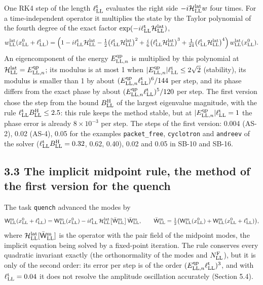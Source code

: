 \documentclass[
  10pt,
]{article}
\begin{document}
One RK4 step of the length \(\ell^{\rm t}_{\rm LL}\) evaluates the right
side \(-i\mathcal H^{\rm lat}_{\rm LL}w\) four times. For a
time-independent operator it multiplies the state by the Taylor
polynomial of the fourth degree of the exact factor
\(\exp(-i\ell^{\rm t}_{\rm LL}\mathcal H^{\rm lat}_{\rm LL})\),
\[w^{\rm lat}_{\rm LL}(x^0_{\rm LL}+\ell^{\rm t}_{\rm LL})=\Big(1-i\ell^{\rm t}_{\rm LL}\mathcal H^{\rm lat}_{\rm LL}-\tfrac12\big(\ell^{\rm t}_{\rm LL}\mathcal H^{\rm lat}_{\rm LL}\big)^2+\tfrac{i}{6}\big(\ell^{\rm t}_{\rm LL}\mathcal H^{\rm lat}_{\rm LL}\big)^3+\tfrac1{24}\big(\ell^{\rm t}_{\rm LL}\mathcal H^{\rm lat}_{\rm LL}\big)^4\Big)\,w^{\rm lat}_{\rm LL}(x^0_{\rm LL}).\]
An eigencomponent of the energy \(E^{\rm qp}_{{\rm LL},n}\) is
multiplied by this polynomial at
\(\mathcal H^{\rm lat}_{\rm LL}=E^{\rm qp}_{{\rm LL},n}\); its modulus
is at most 1 when
\(\lvert E^{\rm qp}_{{\rm LL},n}\rvert\ell^{\rm t}_{\rm LL}\le2\sqrt2\)
(stability), its modulus is smaller than 1 by about
\((E^{\rm qp}_{{\rm LL},n}\ell^{\rm t}_{\rm LL})^6/144\) per step, and
its phase differs from the exact phase by about
\((E^{\rm qp}_{{\rm LL},n}\ell^{\rm t}_{\rm LL})^5/120\) per step. The
first version chose the step from the bound \(B^{\rm H}_{\rm LL}\) of
the largest eigenvalue magnitude, with the rule
\(\ell^{\rm t}_{\rm LL}B^{\rm H}_{\rm LL}\le2.5\): this rule keeps the
method stable, but at
\(\lvert E^{\rm qp}_{{\rm LL},n}\rvert\ell^{\rm t}_{\rm LL}=1\) the
phase error is already \(8\times10^{-3}\) per step. The steps of the
first version: 0.004 (AS-2), 0.02 (AS-4), 0.05 for the examples
\texttt{packet\_free}, \texttt{cyclotron} and \texttt{andreev} of the
solver (\(\ell^{\rm t}_{\rm LL}B^{\rm H}_{\rm LL}=0.32\), 0.62, 0.40),
0.02 and 0.05 in SB-10 and SB-16.

\hypertarget{the-implicit-midpoint-rule-the-method-of-the-first-version-for-the-quench}{%
\subsection{3.3 The implicit midpoint rule, the method of the first
version for the
quench}\label{the-implicit-midpoint-rule-the-method-of-the-first-version-for-the-quench}}

The task \texttt{quench} advanced the modes by
\[\mathsf W^{\rm m}_{\rm LL}(x^0_{\rm LL}+\ell^{\rm t}_{\rm LL})=\mathsf W^{\rm m}_{\rm LL}(x^0_{\rm LL})-i\ell^{\rm t}_{\rm LL}\,\mathcal H^{\rm lat}_{\rm LL}\big[\bar{\mathsf W}^{\rm m}_{\rm LL}\big]\,\bar{\mathsf W}^{\rm m}_{\rm LL},\qquad \bar{\mathsf W}^{\rm m}_{\rm LL}=\tfrac12\big(\mathsf W^{\rm m}_{\rm LL}(x^0_{\rm LL})+\mathsf W^{\rm m}_{\rm LL}(x^0_{\rm LL}+\ell^{\rm t}_{\rm LL})\big),\]
where
\(\mathcal H^{\rm lat}_{\rm LL}[\bar{\mathsf W}^{\rm m}_{\rm LL}]\) is
the operator with the pair field of the midpoint modes, the implicit
equation being solved by a fixed-point iteration. The rule conserves
every quadratic invariant exactly (the orthonormality of the modes and
\(N^{\rm F}_{\rm LL}\)), but it is only of the second order: its error
per step is of the order
\((E^{\rm qp}_{{\rm LL},n}\ell^{\rm t}_{\rm LL})^3\), and with
\(\ell^{\rm t}_{\rm LL}=0.04\) it does not resolve the amplitude
oscillation accurately (Section 5.4).
\end{document}
